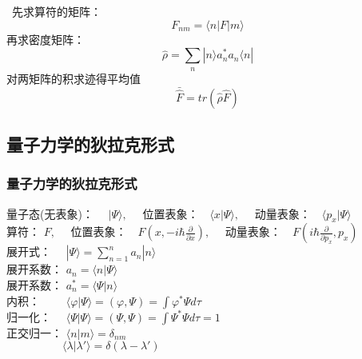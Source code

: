  
\begin{frame}      
    \例[28、求算符$\hat{F}$在 $|\Psi\rangle =\sum\limits_n a_n |n\rangle $上的平均值]{}
    \解~先求算符的矩阵：
    $$ F_{nm} = \langle n | F |m \rangle  $$
    再求密度矩阵：
    $$ \hat{\rho} = \sum\limits_{n}| n \rangle  a_n ^* a_n \langle n | $$
    对两矩阵的积求迹得平均值
    $$\bar{\hat{F}}=tr (\hat{\rho} \hat{F} )$$
\end{frame} 
 
\subsection{量子力学的狄拉克形式}

\begin{frame} 
    \frametitle{量子力学的狄拉克形式}  
    量子态(无表象)： $\hspace{1em}|\Psi \rangle, \quad$ 位置表象：$\hspace{1em} \langle x |\Psi \rangle , \quad$ 动量表象：$\hspace{1em} \langle p_x |\Psi \rangle$ \\ \vspace{0.1em}
    算符： $F, \quad$ 位置表象：$\hspace{1em} F(x, -i\hbar \frac{\partial }{\partial x}) , \quad$ 动量表象：$\hspace{1em} F(i\hbar \frac{\partial }{\partial p_x}, p_x) $ \\ \vspace{0.1em}
    展开式： $\hspace{1em}|\Psi \rangle =\sum\limits_{n=1} ^n a_n |n \rangle$ \\ \vspace{0.2em}
    展开系数： $ a_n= \langle n | \Psi \rangle$ \\ \vspace{0.2em}
    展开系数： $ a_n ^*= \langle \Psi | n \rangle$ \\ \vspace{0.2em}
    内积：   $\hspace{2em}\langle \varphi | \Psi \rangle = (\varphi, \Psi)= \int \varphi^*\Psi d\tau $ \\  \vspace{0.1em}
    归一化： $\hspace{1em}\langle \Psi | \Psi \rangle = (\Psi, \Psi)= \int \Psi^*\Psi d\tau = 1 $ \\ \vspace{0.1em}
    正交归一： $\langle n | m \rangle = \delta_{nm} $ \\ \vspace{0.1em}
    $ \hspace{5em} \langle \lambda | \lambda' \rangle = \delta(\lambda-\lambda') $
\end{frame} 
 
